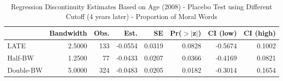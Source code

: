 \begin{table}[ht]
\centering
\begin{tabular}{lrrrrrrr}
  \hline
 & Bandwidth & Obs. & Est. & SE & Pr($>$$|$z$|$) & CI (low) & CI (high) \\ 
  \hline
LATE & 2.5000 & 133 & -0.0554 & 0.0319 & 0.0828 & -0.5674 & 0.1002 \\ 
  Half-BW & 1.2500 & 77 & -0.0433 & 0.0207 & 0.0366 & -0.4169 & 0.0821 \\ 
  Double-BW & 5.0000 & 324 & -0.0483 & 0.0205 & 0.0182 & -0.3014 & 0.1654 \\ 
   \hline
\end{tabular}
\caption{Regression Discontinuity Estimates Based on Age (2008) - Placebo Test using Different Cutoff (4 years later) - Proportion of Moral Words} 
\label{tab:Xrd2008y_plac}
\end{table}
